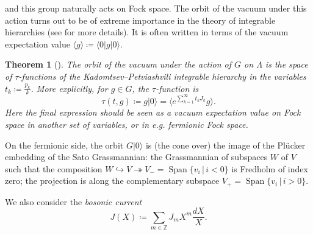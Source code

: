 \documentclass[10pt,a4paper,oneside,no-math,reqno]{amsart}%
\theoremstyle{plain}
\newtheorem{theorem}{Theorem}[section]
\theoremstyle{definition}
\theoremstyle{remark}
\numberwithin{equation}{section}
\newcommand{\mb}[1]{\mathbb{#1}}
\newcommand{\1}{\mathds{1}}
\newcommand{\Z}{\mb{Z}}
\newcommand{\<}{\langle}
\renewcommand{\>}{\rangle}
\begin{document}
and this group naturally acts on Fock space. The orbit of the vacuum under this action turns out to be of extreme importance in the theory of integrable hierarchies (see \cite{MJD00} for more details). It is often written in terms of the vacuum expectation value $ \< g\> \coloneqq \< 0 | g | 0 \>$.

\begin{theorem}[{\cite{SS83}}]\label{SatoKP}
    The orbit of the vacuum under the action of $ G $ on $ \Lambda$ is the space of $\tau $-functions of the Kadomtsev--Petviashvili integrable hierarchy in the variables $ t_k \coloneqq \frac{p_k}{k}$. More explicitly, for $ g \in G$, the $ \tau$-function is
    \begin{equation}
        \tau (t, g) 
        \coloneqq
        g | 0 \>
        =
        \< e^{\sum_{k=1}^\infty t_k J_k} g \>.
    \end{equation}
    Here the final expression should be seen as a vacuum expectation value on Fock space in \emph{another} set of variables, or in e.g. fermionic Fock space.
\end{theorem}

On the fermionic side, the orbit $ G | 0 \> $ is (the cone over) the image of the Plücker embedding of the Sato Grassmannian: the Grassmannian of subspaces $ W$ of $ V $ such that the composition $ W \hookrightarrow V \twoheadrightarrow V_- = \mathop{\mathrm{Span}} \{ v_i \, | \, i < 0\} $ is Fredholm of index zero; the projection is along the complementary subspace $V_+ = \mathop{\mathrm{Span}} \{ v_i \, | \, i > 0\} $.

We also consider the \emph{bosonic current}
\begin{equation}
    J(X)
    \coloneqq
    \sum_{m \in \Z } J_m X^m \frac{dX}{X} .
\end{equation}
\end{document}
